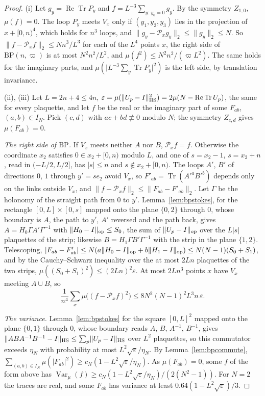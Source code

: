 \documentclass[aps,prd,twocolumn,superscriptaddress,nofootinbib,longbibliography,floatfix,amsmath,amssymb,10pt]{revtex4-2}
\theoremstyle{definition}
\theoremstyle{remark}
\newcommand{\Tr}{\operatorname{Tr}}
\newcommand{\ReTr}{\operatorname{Re}\operatorname{Tr}}
\newcommand{\Var}{\operatorname{Var}}
\begin{document}
\begin{proof}
(i) Let $g_y=\ReTr P_y$ and $f=L^{-3}\sum_{y:\,y_0=0}g_y$. By the symmetry
$Z_{1,0}$, $\mu(f)=0$. The loop $P_y$ meets $V_x$ only if
$(y_1,y_2,y_3)$ lies in the projection of $x+[0,n)^4$, which holds for
$n^3$ loops, and $\lVert g_y-\mathcal P_xg_y\rVert_2\le\lVert g_y\rVert_2\le
N$. So $\lVert f-\mathcal P_xf\rVert_2\le Nn^3/L^3$ for each of the $L^4$
points $x$, the right side of $\mathrm{BP}(n,\varpi)$ is at most $N^2n^2/L^2$,
and $\mu(f^2)\le N^2n^2/(\varpi L^2)$. The same holds for the imaginary
parts, and $\mu(\lvert L^{-3}\sum_y\Tr P_y\rvert^2)$ is the left side, by
translation invariance.

(ii), (iii) Let $L=2n+4\le4n$, $\varepsilon=\mu(\lVert U_p-I\rVert_{\rm HS}^2)=
2\mu(N-\ReTr U_p)$, the same for every plaquette, and let $f$ be the real or
the imaginary part of some $F_{ab}$, $(a,b)\in I_N$. Pick $(c,d)$ with $ac+bd
\not\equiv0$ modulo $N$; the symmetry $Z_{c,d}$ gives $\mu(F_{ab})=0$.

\emph{The right side of $\mathrm{BP}$.} If $V_x$ meets neither $A$ nor $B$,
$\mathcal P_xf=f$. Otherwise the coordinate $x_2$ satisfies $0\in x_2+[0,n)$
modulo $L$, and one of $s=x_2-1$, $s=x_2+n$, read in $(-L/2,L/2]$, has $\lvert
s\rvert\le n$ and $s\notin x_2+[0,n)$. The loops $A'$, $B'$ of directions
$0$, $1$ through $y'=se_2$ avoid $V_x$, so $F'_{ab}=\Tr(A'^aB'^b)$ depends
only on the links outside $V_x$, and $\lVert f-\mathcal P_xf\rVert_2\le
\lVert F_{ab}-F'_{ab}\rVert_2$. Let $\Gamma$ be the holonomy of the straight
path from $0$ to $y'$. Lemma~\ref{lem:bpstokes}, for the rectangle $[0,L]
\times[0,s]$ mapped onto the plane $\{0,2\}$ through $0$, whose boundary is
$A$, the path to $y'$, $A'$ reversed and the path back, gives $A=H_0\Gamma
A'\Gamma^{-1}$ with $\lVert H_0-I\rVert_{\rm op}\le S_0$, the sum of
$\lVert U_p-I\rVert_{\rm op}$ over the $L\lvert s\rvert$ plaquettes of the
strip; likewise $B=H_1\Gamma B'\Gamma^{-1}$ with the strip in the plane $\{1,
2\}$. Telescoping, $\lvert F_{ab}-F'_{ab}\rvert\le N(a\lVert H_0-I\rVert_{
\rm op}+b\lVert H_1-I\rVert_{\rm op})\le N(N-1)(S_0+S_1)$, and by the
Cauchy--Schwarz inequality over the at most $2Ln$ plaquettes of the two
strips, $\mu((S_0+S_1)^2)\le(2Ln)^2\varepsilon$. At most $2Ln^3$ points $x$
have $V_x$ meeting $A\cup B$, so
\[
\frac1{n^4}\sum_x\mu\bigl((f-\mathcal P_xf)^2\bigr)\le8N^2(N-1)^2L^3n\,
\varepsilon .
\]

\emph{The variance.} Lemma~\ref{lem:bpstokes} for the square $[0,L]^2$
mapped onto the plane $\{0,1\}$ through $0$, whose boundary reads $A$, $B$,
$A^{-1}$, $B^{-1}$, gives $\lVert ABA^{-1}B^{-1}-I\rVert_{\rm HS}\le\sum_p
\lVert U_p-I\rVert_{\rm HS}$ over $L^2$ plaquettes, so this commutator
exceeds $\eta_N$ with probability at most $L^2\sqrt\varepsilon/\eta_N$. By
Lemma~\ref{lem:bpcommute}, $\sum_{(a,b)\in I_N}\mu(\lvert F_{ab}\rvert^2)\ge
c_N(1-L^2\sqrt\varepsilon/\eta_N)$. As $\mu(F_{ab})=0$, some $f$ of the
form above has $\Var_\mu(f)\ge c_N(1-L^2\sqrt\varepsilon/\eta_N)/(2(N^2-1))$.
For $N=2$ the traces are real, and some $F_{ab}$ has variance at least
$0.64(1-L^2\sqrt\varepsilon)/3$.


\end{proof}
\end{document}
